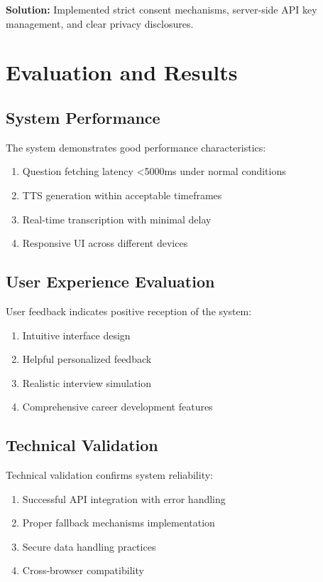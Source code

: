 \documentclass[12pt, conference]{IEEEtran}
\begin{document}
\noindent\textbf{Solution:} Implemented strict consent mechanisms, server-side API key management, and clear privacy disclosures.

\section{Evaluation and Results}

\subsection{System Performance}

The system demonstrates good performance characteristics:
\begin{enumerate}
    \item Question fetching latency <5000ms under normal conditions
    \item TTS generation within acceptable timeframes
    \item Real-time transcription with minimal delay
    \item Responsive UI across different devices
\end{enumerate}

\subsection{User Experience Evaluation}

User feedback indicates positive reception of the system:
\begin{enumerate}
    \item Intuitive interface design
    \item Helpful personalized feedback
    \item Realistic interview simulation
    \item Comprehensive career development features
\end{enumerate}

\subsection{Technical Validation}

Technical validation confirms system reliability:
\begin{enumerate}
    \item Successful API integration with error handling
    \item Proper fallback mechanisms implementation
    \item Secure data handling practices
    \item Cross-browser compatibility
\end{enumerate}
\end{document}
